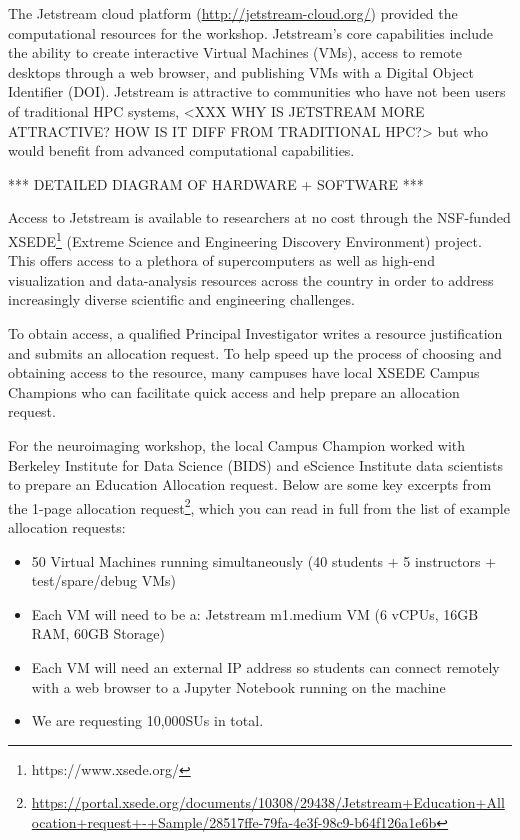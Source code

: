 The Jetstream\cite{Stewart2015Jetstream} cloud platform (\url{http://jetstream-cloud.org/}) provided the
computational resources for the workshop. Jetstream's core capabilities include
the ability to create interactive Virtual Machines (VMs), access to remote
desktops through a web browser, and publishing VMs with a Digital Object
Identifier (DOI). Jetstream is
attractive to communities who have not been users of traditional HPC systems,
<XXX WHY IS JETSTREAM MORE ATTRACTIVE? HOW IS IT DIFF FROM TRADITIONAL HPC?>
but who would benefit from advanced computational capabilities.

*** DETAILED DIAGRAM OF HARDWARE + SOFTWARE ***

Access to Jetstream is available to researchers at no cost through the
NSF-funded XSEDE\footnote{https://www.xsede.org/} (Extreme Science and
Engineering Discovery Environment) project\cite{Towns2014XSEDE}. This
offers access to a plethora of supercomputers as well as high-end
visualization and data-analysis resources across the
country in order to address increasingly diverse scientific and
engineering challenges.

To obtain access, a qualified Principal Investigator writes a resource
justification and submits an allocation request. To help speed up the
process of choosing and obtaining access to the resource, many campuses
have local XSEDE Campus Champions who can facilitate quick access and
help prepare an allocation request.

For the neuroimaging workshop, the local Campus Champion worked with Berkeley
Institute for Data Science (BIDS) and eScience Institute data scientists to
prepare an Education Allocation request. Below are some key excerpts from the
1-page allocation request\footnote{\url{https://portal.xsede.org/documents/10308/29438/Jetstream+Education+Allocation+request+-+Sample/28517ffe-79fa-4e3f-98c9-b64f126a1e6b}},
which you can read in full from the list of example allocation requests:

\begin{itemize}
\item 50 Virtual Machines running simultaneously (40 students + 5 instructors +
test/spare/debug VMs)
\item Each VM will need to be a: Jetstream m1.medium VM (6 vCPUs, 16GB RAM, 60GB
  Storage)
\item Each VM will need an external IP address so students can connect remotely
  with a web browser to a Jupyter Notebook running on the machine
\item We are requesting 10,000SUs in total.
\end{itemize}

